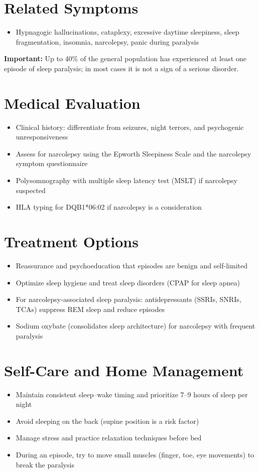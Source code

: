 \section*{Related Symptoms}
\begin{itemize}
  \item Hypnagogic hallucinations, cataplexy, excessive daytime sleepiness, sleep fragmentation, insomnia, narcolepsy, panic during paralysis
\end{itemize}
\textbf{Important:} Up to 40\% of the general population has experienced at least one episode of sleep paralysis; in most cases it is not a sign of a serious disorder.

\section*{Medical Evaluation}
\begin{itemize}
  \item Clinical history: differentiate from seizures, night terrors, and psychogenic unresponsiveness
  \item Assess for narcolepsy using the Epworth Sleepiness Scale and the narcolepsy symptom questionnaire
  \item Polysomnography with multiple sleep latency test (MSLT) if narcolepsy suspected
  \item HLA typing for DQB1*06:02 if narcolepsy is a consideration
\end{itemize}

\section*{Treatment Options}
\begin{itemize}
  \item Reassurance and psychoeducation that episodes are benign and self-limited
  \item Optimize sleep hygiene and treat sleep disorders (CPAP for sleep apnea)
  \item For narcolepsy-associated sleep paralysis: antidepressants (SSRIs, SNRIs, TCAs) suppress REM sleep and reduce episodes
  \item Sodium oxybate (consolidates sleep architecture) for narcolepsy with frequent paralysis
\end{itemize}

\section*{Self-Care and Home Management}
\begin{itemize}
  \item Maintain consistent sleep--wake timing and prioritize 7--9 hours of sleep per night
  \item Avoid sleeping on the back (supine position is a risk factor)
  \item Manage stress and practice relaxation techniques before bed
  \item During an episode, try to move small muscles (finger, toe, eye movements) to break the paralysis
\end{itemize}

